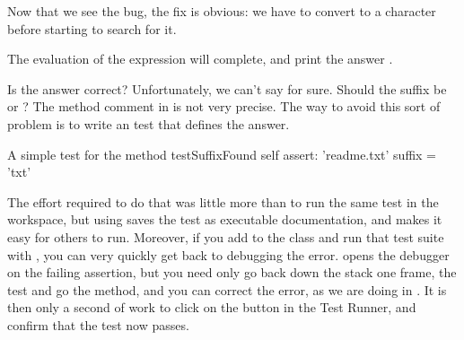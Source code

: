 \documentclass[a4paper,10pt,twoside]{book}
\begin{document}
Now that we see the bug, the fix is obvious: we have to convert  to a character before starting to search for it.  





The evaluation of the expression  will complete, and print the answer .

Is the answer correct?  Unfortunately, we can't say for sure.  Should the suffix be  or ?
The method comment in  is not very precise.  
The way to avoid this sort of problem is to write an  test that defines the answer.

\begin{method}[testSuffix]{A simple test for the  method}
testSuffixFound
	self assert: 'readme.txt' suffix = 'txt'
\end{method}

The effort required to do that was little more than to run the same test in the workspace, but using \sunit saves the test as executable documentation, and makes it easy for others to run.
Moreover, if you add  to the class  and run that test suite with \sunit, you can very quickly get back to debugging the error.
\sunit opens the debugger on the failing assertion, but you need only go back down the stack one frame,  the test and go  the  method, and you can correct the error, as we are doing in .
It is then only  a second of work to click on the  button in the \sunit Test Runner, and confirm that the test now passes.
\end{document}
